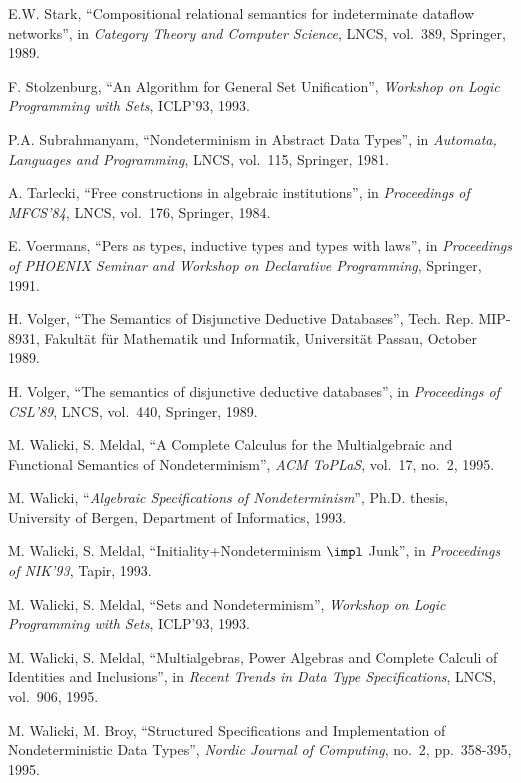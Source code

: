  E.W. Stark, ``Compositional relational semantics for 
indeterminate dataflow networks'', in {\em Category Theory and Computer 
Science}, LNCS, vol.~389, Springer, 1989.

 F. Stolzenburg, ``An Algorithm for General Set 
Unification'', {\em Workshop on Logic Programming with Sets}, ICLP'93, 
1993.

 P.A. Subrahmanyam, ``Nondeterminism in Abstract Data 
Types'', in {\em Automata, Languages and Programming}, LNCS, vol.~115, 
Springer, 1981.

 A. Tarlecki, ``Free constructions in algebraic 
institutions'', in {\em Proceedings of MFCS'84}, LNCS, vol.~176, Springer, 
1984.

 E. Voermans, ``Pers as types, inductive types and 
types with laws'', in {\em Proceedings of PHOENIX Seminar and Workshop on 
Declarative Programming}, Springer, 1991.

 H. Volger, ``The Semantics of Disjunctive Deductive 
Databases'', Tech.  Rep.  MIP-8931, Fakult\"{a}t f\"{u}r Mathematik und 
Informatik, Universit\"{a}t Passau, October 1989.

 H. Volger, ``The semantics of disjunctive deductive 
databases'', in {\em Proceedings of CSL'89}, LNCS, vol.~440, Springer, 
1989.

 M. Walicki, S. Meldal, ``A Complete Calculus for the 
Multialgebraic and Functional Semantics of Nondeterminism'', {\em ACM 
ToPLaS}, vol.~17, no.~2, 1995.

 M. Walicki, ``{\em Algebraic Specifications of 
Nondeterminism}'', Ph.D. thesis, University of Bergen, Department of 
Informatics, 1993.

 M. Walicki, S. Meldal, ``Initiality+Nondeterminism 
$\impl$ Junk'', in {\em Proceedings of NIK'93}, Tapir, 1993.

 M. Walicki, S. Meldal, ``Sets and Nondeterminism'', 
{\em Workshop on Logic Programming with Sets}, ICLP'93, 1993.

 M. Walicki, S. Meldal, ``Multialgebras, Power Algebras 
and Complete Calculi of Identities and Inclusions'', in {\em Recent Trends 
in Data Type Specifications}, LNCS, vol.~906, 1995.

 M. Walicki, M. Broy, ``Structured Specifications and 
Implementation of Nondeterministic Data Types'', {\em Nordic Journal of 
Computing}, no.~2,  pp.~358-395, 1995.

